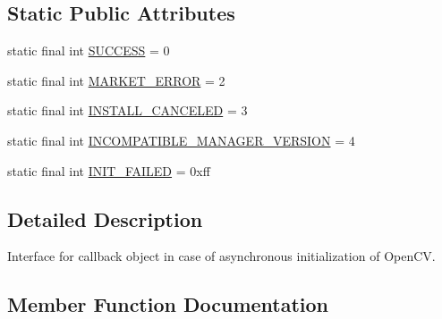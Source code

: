 \subsection*{Static Public Attributes}
\begin{DoxyCompactItemize}
\item 
static final int \mbox{\hyperlink{interfaceorg_1_1opencv_1_1android_1_1_loader_callback_interface_a78294b158a76d2305db417b99260ac79}{S\+U\+C\+C\+E\+SS}} = 0
\item 
static final int \mbox{\hyperlink{interfaceorg_1_1opencv_1_1android_1_1_loader_callback_interface_abc3ec7f651a8c1d378a658847a84fc2f}{M\+A\+R\+K\+E\+T\+\_\+\+E\+R\+R\+OR}} = 2
\item 
static final int \mbox{\hyperlink{interfaceorg_1_1opencv_1_1android_1_1_loader_callback_interface_aad7fcd4ecddbd54ff3c480a99cc88c4b}{I\+N\+S\+T\+A\+L\+L\+\_\+\+C\+A\+N\+C\+E\+L\+ED}} = 3
\item 
static final int \mbox{\hyperlink{interfaceorg_1_1opencv_1_1android_1_1_loader_callback_interface_aebec7f8260285302800ba33b0bcf5f11}{I\+N\+C\+O\+M\+P\+A\+T\+I\+B\+L\+E\+\_\+\+M\+A\+N\+A\+G\+E\+R\+\_\+\+V\+E\+R\+S\+I\+ON}} = 4
\item 
static final int \mbox{\hyperlink{interfaceorg_1_1opencv_1_1android_1_1_loader_callback_interface_a10b99044b99b07604531d2db4da300dc}{I\+N\+I\+T\+\_\+\+F\+A\+I\+L\+ED}} = 0xff
\end{DoxyCompactItemize}


\subsection{Detailed Description}
Interface for callback object in case of asynchronous initialization of Open\+CV. 

\subsection{Member Function Documentation}
\mbox{\label{interfaceorg_1_1opencv_1_1android_1_1_loader_callback_interface_ad2407cf1886354b965b8ebd97b7164ff}} 
